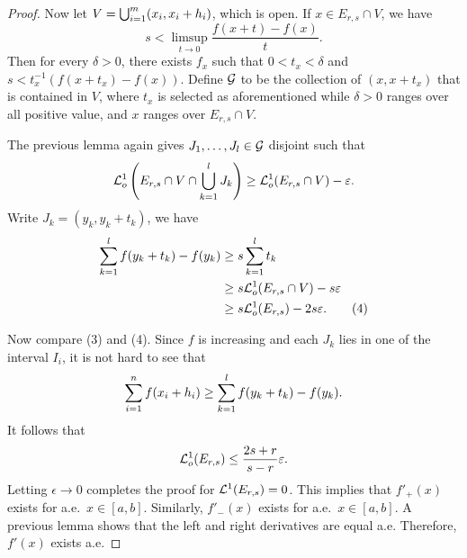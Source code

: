 \documentclass[a4paper]{article}
\begin{document}
\begin{proof}
  Now let $V = \bigcup_{i=1}^m (x_i, x_i + h_i)$, which is open. If $x \in E_{r,
  s} \cap V$, we have
  \[
    s < \limsup_{t \to 0} \frac{f(x + t) - f(x)}{t}.
  \]
  Then for every $\delta > 0$, there exists $f_x$ such that $0 < t_x <
  \delta$ and $s < t_x^{-1} (f(x + t_x) - f(x))$. Define $\mathcal{G}$ to be the
  collection of $(x, x + t_x)$ that is contained in $V$, where $t_x$ is
  selected as aforementioned while $\delta > 0$ ranges over all positive
  value, and $x$ ranges over $E_{r, s} \cap V$.

  The previous lemma again gives $J_1, \dots, J_l \in \mathcal{G}$ disjoint such
  that
  \begin{align*}
    \mathcal{L}_o^1 \left( E_{r, s} \cap V \cap \bigcup_{k=1}^l J_k \right)
    \geq \mathcal{L}_o^1 (E_{r,s} \cap V) - \varepsilon.
  \end{align*}
  Write $J_k = (y_k, y_k + t_k)$, we have
  \begin{align*}
    \sum_{k=1}^l f(y_k + t_k) - f(y_k)
     & \geq s \sum_{k=1}^l t_k                              \\
     & \geq s \mathcal{L}_o^1 (E_{r,s} \cap V) - s \varepsilon     \\
     & \geq s \mathcal{L}_o^1 (E_{r,s}) - 2 s \varepsilon. \tag{4}
  \end{align*}

  Now compare (3) and (4). Since $f$ is increasing and each $J_k$ lies in
  one of the interval $I_i$, it is not hard to see that
  \[
    \sum_{i=1}^n f(x_i + h_i) \geq \sum_{k=1}^l f(y_k + t_k) - f(y_k).
  \]
  It follows that
  \[
    \mathcal{L}_o^1 (E_{r, s}) \leq \frac{2s + r}{s - r} \varepsilon.
  \]
  Letting $\epsilon \to 0$ completes the proof for $\mathcal{L}^1 (E_{r, s}) = 0$.
  This implies that $f'_+ (x)$ exists for a.e.\ $x \in [a, b]$. Similarly,
  $f'_-(x)$ exists for a.e.\ $x \in [a, b]$. A previous lemma shows that
  the left and right derivatives are equal a.e. Therefore, $f'(x)$ exists
  a.e.


\end{proof}
\end{document}
